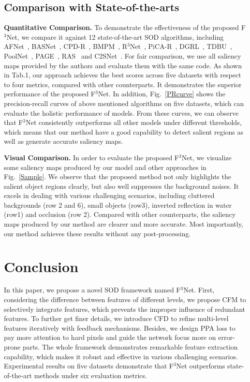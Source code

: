 \documentclass[letterpaper]{article} %
\begin{document}
\subsection{Comparison with State-of-the-arts}
\textbf{Quantitative Comparison.}
To demonstrate the effectiveness of the proposed F$^3$Net, we compare it against 12 state-of-the-art SOD algorithms, including AFNet~\cite{AFNet}, BASNet~\cite{BASNet}, CPD-R~\cite{CPD}, BMPM~\cite{BMPM}, R$^3$Net~\cite{R3Net}, PiCA-R~\cite{PiCANet}, DGRL~\cite{DGRL}, TDBU~\cite{TDBU}, PoolNet~\cite{PoolNet}, PAGE~\cite{PAGE}, RAS~\cite{RAS} and C2SNet~\cite{C2SNet}. For fair comparison, we use all saliency maps provided by the authors and evaluate them with the same code. As shown in Tab.1, our approach achieves the best scores across five datasets with respect to four metrics, compared with other counterparts. It demonstrates the superior performance of the proposed F$^3$Net. In addition, Fig.~\ref{PRcurve} shows the precision-recall curves of above mentioned algorithms on five datasets, which can evaluate the holistic performance of models. From these curves, we can observe that F$^3$Net consistently outperforms all other models under different thresholds, which means that our method have a good capability to detect salient regions as well as generate accurate saliency maps.

\textbf{Visual Comparison.}
In order to evaluate the proposed F$^3$Net, we visualize some saliency maps produced by our model and other approaches in Fig.~\ref{Sample}. We observe that the proposed method not only highlights the salient object regions clearly, but also well suppresses the background noises. It excels in dealing with various challenging scenarios, including cluttered backgrounds (row 2 and 6), small objects (row3), inverted reflection in water (row1) and occlusion (row 2). Compared with other counterparts, the saliency maps produced by our method are clearer and more accurate. Most importantly, our method achieves these results without any post-processing.

\section{Conclusion}
In this paper, we propose a novel SOD framework named F$^3$Net. First, considering the difference between features of different levels, we propose CFM to selectively integrate features, which prevents the improper influence of redundant features. To further get finer details, we introduce CFD to refine multi-level features iteratively with feedback mechanisms. Besides, we design PPA loss to pay more attention to hard pixels and guide the network focus more on error-prone parts. The whole framework demonstrates remarkable feature extraction capability, which makes it robust and effective in various challenging scenarios. Experimental results on five datasets demonstrate that F$^3$Net outperforms state-of-the-art methods under six evaluation metrics.
\end{document}
